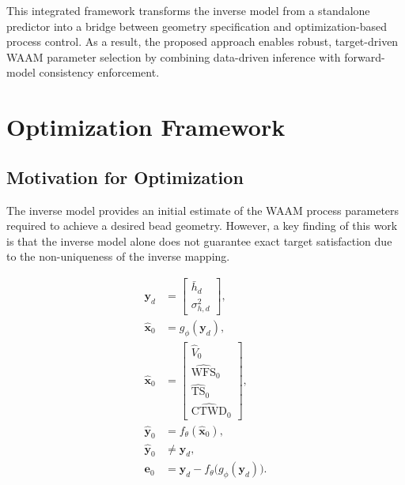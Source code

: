 \documentclass[11pt]{article}
\begin{document}
This integrated framework transforms the inverse model from a standalone predictor into a bridge between geometry specification and optimization-based process control. As a result, the proposed approach enables robust, target-driven WAAM parameter selection by combining data-driven inference with forward-model consistency enforcement.

\section{Optimization Framework}

\subsection{Motivation for Optimization}

The inverse model provides an initial estimate of the WAAM process parameters required to achieve a desired bead geometry. However, a key finding of this work is that the inverse model alone does not guarantee exact target satisfaction due to the non-uniqueness of the inverse mapping.

\begin{tcolorbox}[colback=white,colframe=black,boxrule=0.5pt,arc=2pt]
\begin{equation}
\begin{aligned}
\mathbf{y}_{d} &=
\begin{bmatrix}
\bar{h}_{d} \\
\sigma_{h,d}^{2}
\end{bmatrix}, \\
\hat{\mathbf{x}}_{0} &= g_{\phi}(\mathbf{y}_{d}), \\
\hat{\mathbf{x}}_{0} &=
\begin{bmatrix}
\hat{V}_{0} \\
\widehat{\mathrm{WFS}}_{0} \\
\widehat{\mathrm{TS}}_{0} \\
\widehat{\mathrm{CTWD}}_{0}
\end{bmatrix}, \\
\hat{\mathbf{y}}_{0} &= f_{\theta}(\hat{\mathbf{x}}_{0}), \\
\hat{\mathbf{y}}_{0} &\neq \mathbf{y}_{d}, \\
\mathbf{e}_{0} &= \mathbf{y}_{d} - f_{\theta}\big(g_{\phi}(\mathbf{y}_{d})\big).
\end{aligned}
\end{equation}
\end{tcolorbox}
\end{document}
